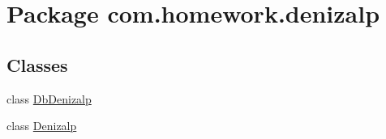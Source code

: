 \hypertarget{namespacecom_1_1homework_1_1denizalp}{}\section{Package com.\+homework.\+denizalp}
\label{namespacecom_1_1homework_1_1denizalp}
\subsection*{Classes}
\begin{DoxyCompactItemize}
\item 
class \hyperlink{classcom_1_1homework_1_1denizalp_1_1_db_denizalp}{Db\+Denizalp}
\item 
class \hyperlink{classcom_1_1homework_1_1denizalp_1_1_denizalp}{Denizalp}
\end{DoxyCompactItemize}
